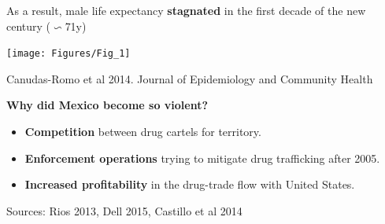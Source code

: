 \documentclass[xcolor={dvipsnames}]{beamer}
\begin{document}
\begin{frame}
	\begin{center}
		\Large{	As a result, male life expectancy \textbf{stagnated} in the first decade of the new century ($\backsim 	$71y)}
	\end{center}
		
	\begin{center}
		\texttt{[image: Figures/Fig\_1]}
	\end{center}

	\tiny{Canudas-Romo et al 2014. Journal of Epidemiology and Community Health}
	
\end{frame}



\begin{frame}
	\huge{
	\begin{center}
		\bf{Why did Mexico become so violent?}
	\end{center}
	}
	
	\pause
	
	\LARGE{
		\begin{itemize}
		
			\item \textbf{Competition} between drug cartels for territory. \pause
		
			\item \textbf{Enforcement operations} trying to mitigate drug trafficking after 2005. \pause
		
    	    \item \textbf{Increased profitability} in the drug-trade flow with United States. 
		
		\end{itemize}
		
	\tiny{Sources: Rios 2013, Dell 2015, Castillo et al 2014}
	}

\end{frame}
\end{document}
